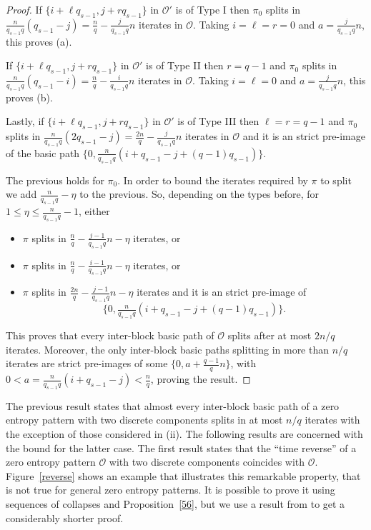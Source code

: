 \documentclass[a4paper]{amsart}
\theoremstyle{definition}
\begin{document}
\begin{proof}
If $\{i+\ell q_{s-1},j+rq_{s-1}\}$ in $\mathcal{O}'$ is of Type I then $\pi_0$ splits in $\frac{n}{q_{s-1}q}(q_{s-1}-j)=\frac{n}{q}-\frac{j}{q_{s-1}q}n$ iterates in $\mathcal{O}$. Taking $i=\ell=r=0$ and $a=\frac{j}{q_{s-1}q}n$, this proves (a).

If $\{i+\ell q_{s-1},j+rq_{s-1}\}$ in $\mathcal{O}'$ is of Type II then $r=q-1$ and $\pi_0$ splits in $\frac{n}{q_{s-1}q}(q_{s-1}-i)=\frac{n}{q}-\frac{i}{q_{s-1}q}n$ iterates in $\mathcal{O}$. Taking $i=\ell=0$ and $a=\frac{j}{q_{s-1}q}n$, this proves (b).

Lastly, if $\{i+\ell q_{s-1},j+rq_{s-1}\}$ in $\mathcal{O}'$ is of Type III then $\ell=r=q-1$ and $\pi_0$ splits in $\frac{n}{q_{s-1}q}(2q_{s-1}-j)=\frac{2n}{q}-\frac{j}{q_{s-1}q}n$ iterates in $\mathcal{O}$ and it is an strict pre-image of the basic path $\{0,\frac{n}{q_{s-1}q}(i+q_{s-1}-j+(q-1)q_{s-1})\}$.

The previous holds for $\pi_0$. In order to bound the iterates required by $\pi$ to split we add $\frac{n}{q_{s-1}q}-\eta$ to the previous. So, depending on the types before, for $1\le\eta\le\frac{n}{q_{s-1}q}-1$, either
\begin{itemize}
\item $\pi$ splits in $\frac{n}{q}-\frac{j-1}{q_{s-1}q}n-\eta$ iterates, or
\item $\pi$ splits in $\frac{n}{q}-\frac{i-1}{q_{s-1}q}n-\eta$ iterates, or
\item $\pi$ splits in $\frac{2n}{q}-\frac{j-1}{q_{s-1}q}n-\eta$ iterates and it is an strict pre-image of \[ \{0,\tfrac{n}{q_{s-1}q}(i+q_{s-1}-j+(q-1)q_{s-1})\}. \]
\end{itemize}
This proves that every inter-block basic path of $\mathcal{O}$ splits after at most $2n/q$ iterates. Moreover, the only inter-block basic paths splitting in more than $n/q$ iterates are strict pre-images of some $\{0,a+\frac{q-1}{q}n\}$, with $0<a=\frac{n}{q_{s-1}q}(i+q_{s-1}-j)<\frac{n}{q}$, proving the result.
\end{proof}

The previous result states that almost every inter-block basic path of a zero entropy pattern with two discrete components splits in at most $n/q$ iterates with
the exception of those considered in (ii). The following results are concerned with the bound for the latter case. The first result states that the ``time reverse''
of a zero entropy pattern $\mathcal{O}$ with two discrete components coincides with $\mathcal{O}$. Figure~\ref{reverse} shows an example that illustrates this remarkable
property, that is not true for general zero entropy patterns. It is possible to prove it using sequences of collapses and Proposition~\ref{56}, but we use
a result from \cite{forward} to get a considerably shorter proof.
\end{document}
